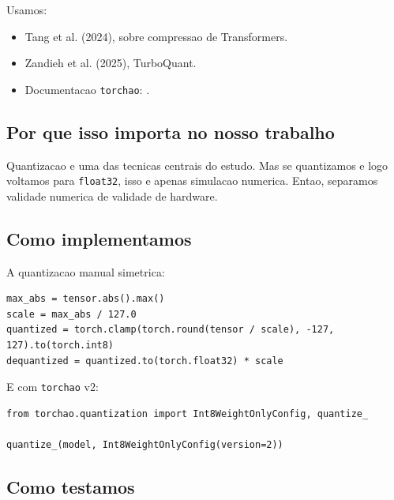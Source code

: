 Usamos:


\begin{itemize}
\item Tang et al. (2024), sobre compressao de Transformers.
\item Zandieh et al. (2025), TurboQuant.
\item Documentacao \texttt{torchao}:
.
\end{itemize}


\subsection{Por que isso importa no nosso trabalho}





Quantizacao e uma das tecnicas centrais do estudo. Mas se quantizamos e logo voltamos para \texttt{float32}, isso e apenas simulacao numerica. Entao, separamos validade numerica de validade de hardware.



\subsection{Como implementamos}



A quantizacao manual simetrica:



\begin{Verbatim}[fontsize=\small,breaklines=true,label=python]
max_abs = tensor.abs().max()
scale = max_abs / 127.0
quantized = torch.clamp(torch.round(tensor / scale), -127, 127).to(torch.int8)
dequantized = quantized.to(torch.float32) * scale
\end{Verbatim}



E com \texttt{torchao} v2:



\begin{Verbatim}[fontsize=\small,breaklines=true,label=python]
from torchao.quantization import Int8WeightOnlyConfig, quantize_

quantize_(model, Int8WeightOnlyConfig(version=2))
\end{Verbatim}



\subsection{Como testamos}



